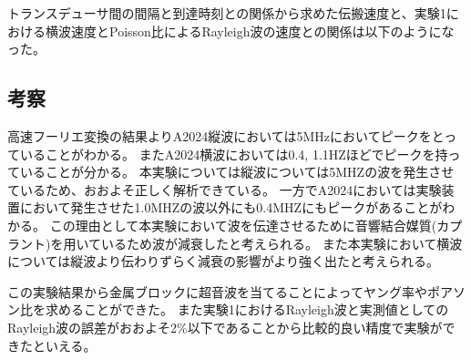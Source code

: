 \documentclass[uplatex,dvipdfmx,titlepage]{jsarticle}
\begin{document}
トランスデューサ間の間隔と到達時刻との関係から求めた伝搬速度と、実験1における横波速度とPoisson比によるRayleigh波の速度との関係は以下のようになった。
\begin{table}[H]
    \centering
\end{table}

\subsection{考察}
高速フーリエ変換の結果よりA2024縦波においては5MHzにおいてピークをとっていることがわかる。
またA2024横波においては0.4, 1.1HZほどでピークを持っていることが分かる。
本実験については縦波については5MHZの波を発生させているため、おおよそ正しく解析できている。
一方でA2024においては実験装置において発生させた1.0MHZの波以外にも0.4MHZにもピークがあることがわかる。
この理由として本実験において波を伝達させるために音響結合媒質(カプラント)を用いているため波が減衰したと考えられる。
また本実験において横波については縦波より伝わりずらく減衰の影響がより強く出たと考えられる。

この実験結果から金属ブロックに超音波を当てることによってヤング率やポアソン比を求めることができた。
また実験1におけるRayleigh波と実測値としてのRayleigh波の誤差がおおよそ2\%以下であることから比較的良い精度で実験ができたといえる。
\end{document}
